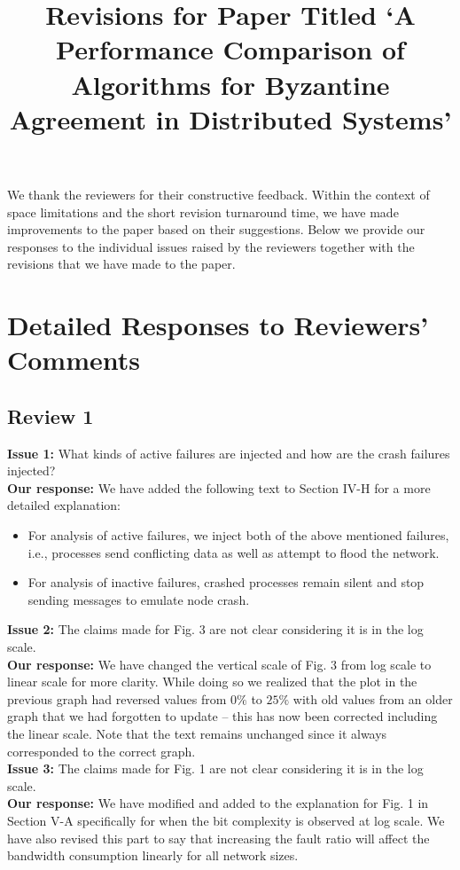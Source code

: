 \documentclass[a4paper]{article}
\title{Revisions for Paper Titled `A Performance Comparison of Algorithms for
Byzantine Agreement in Distributed Systems'}
\begin{document}
\maketitle

We thank the reviewers for their constructive feedback. Within the context of space limitations and the short revision turnaround time, we have made improvements to the paper based on their suggestions. Below we provide our responses to the individual issues raised by the reviewers together with the revisions that we have made to the paper.

\section{Detailed Responses to Reviewers' Comments}
\subsection{Review 1}

\textbf{Issue 1:} What kinds of active failures are injected and how are the crash failures injected? \\
\textbf{Our response:} We have added the following text to Section IV-H for a more detailed explanation:
\begin{itemize}
\item For analysis of active failures, we inject both of the above
mentioned failures, i.e., processes send conflicting data as well
as attempt to flood the network.
\item For analysis of inactive failures, crashed processes remain
silent and stop sending messages to emulate node crash.
\end{itemize} 
\textbf{Issue 2:} The claims made for Fig. 3 are not clear considering it is in the log scale. \\
\textbf{Our response:} We have changed the vertical scale of Fig. 3 from log scale to linear scale for more clarity. While doing so we realized that the plot in the previous graph had reversed values from $0\%$ to $25\%$ with old values from an older graph that we had forgotten to update -- this has now been corrected including the linear scale. Note that the text remains unchanged since it always corresponded to the correct graph.\\

\noindent \textbf{Issue 3:} The claims made for Fig. 1 are not clear considering it is in the log scale. \\
\textbf{Our response:} We have modified and added to the explanation for Fig. 1 in Section V-A specifically for when the bit complexity is observed at log scale. We have also revised this part to say that increasing the fault ratio will affect the bandwidth consumption linearly for all network sizes.\\
\end{document}
